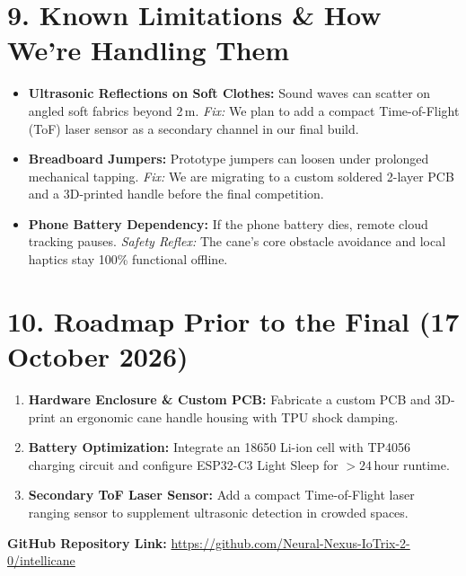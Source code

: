 \documentclass[10pt,a4paper]{article}
\begin{document}
\section{9. Known Limitations \& How We're Handling Them}
\begin{itemize}
    \item \textbf{Ultrasonic Reflections on Soft Clothes:} Sound waves can scatter on angled soft fabrics beyond 2\,m. \textit{Fix:} We plan to add a compact Time-of-Flight (ToF) laser sensor as a secondary channel in our final build.
    \item \textbf{Breadboard Jumpers:} Prototype jumpers can loosen under prolonged mechanical tapping. \textit{Fix:} We are migrating to a custom soldered 2-layer PCB and a 3D-printed handle before the final competition.
    \item \textbf{Phone Battery Dependency:} If the phone battery dies, remote cloud tracking pauses. \textit{Safety Reflex:} The cane's core obstacle avoidance and local haptics stay 100\% functional offline.
\end{itemize}

\section{10. Roadmap Prior to the Final (17 October 2026)}
\begin{enumerate}
    \item \textbf{Hardware Enclosure \& Custom PCB:} Fabricate a custom PCB and 3D-print an ergonomic cane handle housing with TPU shock damping.
    \item \textbf{Battery Optimization:} Integrate an 18650 Li-ion cell with TP4056 charging circuit and configure ESP32-C3 Light Sleep for $>24$\,hour runtime.
    \item \textbf{Secondary ToF Laser Sensor:} Add a compact Time-of-Flight laser ranging sensor to supplement ultrasonic detection in crowded spaces.
\end{enumerate}

\vspace{0.4em}
\noindent\textbf{GitHub Repository Link:} \url{https://github.com/Neural-Nexus-IoTrix-2-0/intellicane}
\end{document}
